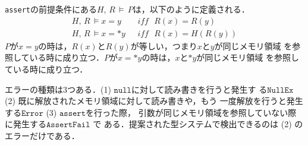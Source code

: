\texttt{assert}の前提条件にある$H,\,R\,\models\,P$は，以下のように定義される．
\[
\begin{aligned}
  H,\,R\,\models x = y ~~~ &\mathit{iff} ~~~ R(x) = R(y) \\
  H,\,R\,\models x = *y ~~~  &\mathit{iff} ~~~ R(x) = H(R(y))
\end{aligned}
\]
$P$が$x=y$の時は，$R(x)$と$R(y)$が等しい，つまり$x$と$y$が同じメモリ領域
を参照している時に成り立つ．$P$が$x=*y$の時は，$x$と$*y$が同じメモリ領域
を参照している時に成り立つ．

エラーの種類は3つある．(1) $\texttt{null}$に対して読み書きを行うと発生す
る$\texttt{NullEx}$ (2) 既に解放されたメモリ領域に対して読み書きや，もう
一度解放を行うと発生する$\texttt{Error}$ (3) $\texttt{assert}$を行った際，
引数が同じメモリ領域を参照していない際に発生する$\texttt{AssertFail}$ で
ある．提案された型システムで検出できるのは (2) のエラーだけである．

